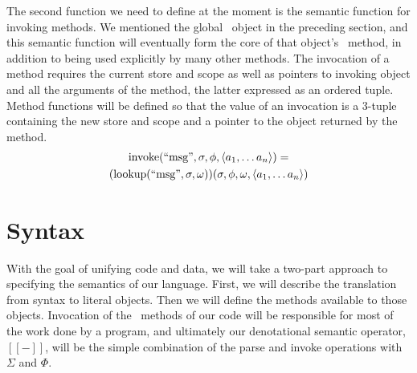 \documentclass[twocolumn]{article}
\begin{document}
The second function we need to define at the moment is the semantic
function for invoking methods. We mentioned the global \msg\ object in
the preceding section, and this semantic function will eventually form
the core of that object's \call\ method, in addition to being used
explicitly by many other methods. The invocation of a method requires
the current store and scope as well as pointers to invoking object and
all the arguments of the method, the latter expressed as an ordered
tuple. Method functions will be defined so that the value of an
invocation is a 3-tuple containing the new store and scope and a
pointer to the object returned by the method.
\begin{multline*}
  \operatorname{invoke}( \text{``msg''}, \sigma, \phi, \left< a_1,\ldots a_n\right>) = \\
  (\operatorname{lookup}(\text{``msg''}, \sigma, \omega))(\sigma,\phi,\omega,
  \left< a_1,\ldots a_n \right> )
\end{multline*}
  
\section*{Syntax}

With the goal of unifying code and data, we will take a two-part
approach to specifying the semantics of our language. First, we will
describe the translation from syntax to literal objects. Then we will
define the methods available to those objects. Invocation of the
\eval\ methods of our code will be responsible for most of the work
done by a program, and ultimately our denotational semantic operator,
$[\![-]\!]$, will be the simple combination of the parse and invoke
operations with $\Sigma$ and $\Phi$.
\end{document}
